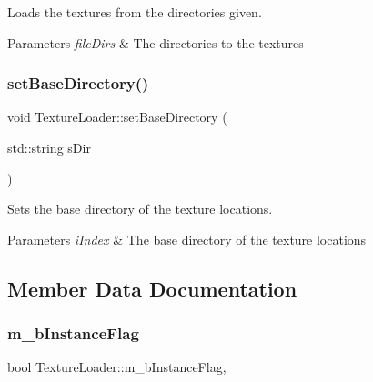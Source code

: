 Loads the textures from the directories given. 


\begin{DoxyParams}{Parameters}
{\em file\+Dirs} & The directories to the textures \\
\hline
\end{DoxyParams}
\mbox{\label{class_texture_loader_a27e7357f47e156e8f771358c3e0c1121}} 
\subsubsection{\texorpdfstring{set\+Base\+Directory()}{setBaseDirectory()}}
{\footnotesize\ttfamily void Texture\+Loader\+::set\+Base\+Directory (\begin{DoxyParamCaption}\item[{std\+::string}]{s\+Dir }\end{DoxyParamCaption})}



Sets the base directory of the texture locations. 


\begin{DoxyParams}{Parameters}
{\em i\+Index} & The base directory of the texture locations \\
\hline
\end{DoxyParams}


\subsection{Member Data Documentation}
\mbox{\label{class_texture_loader_a16bfee9b71c238abe08c2fce039ef1f9}} 
\subsubsection{\texorpdfstring{m\+\_\+b\+Instance\+Flag}{m\_bInstanceFlag}}
{\footnotesize\ttfamily bool Texture\+Loader\+::m\+\_\+b\+Instance\+Flag\hspace{0.3cm}{\ttfamily [static]}, {\ttfamily [private]}}




